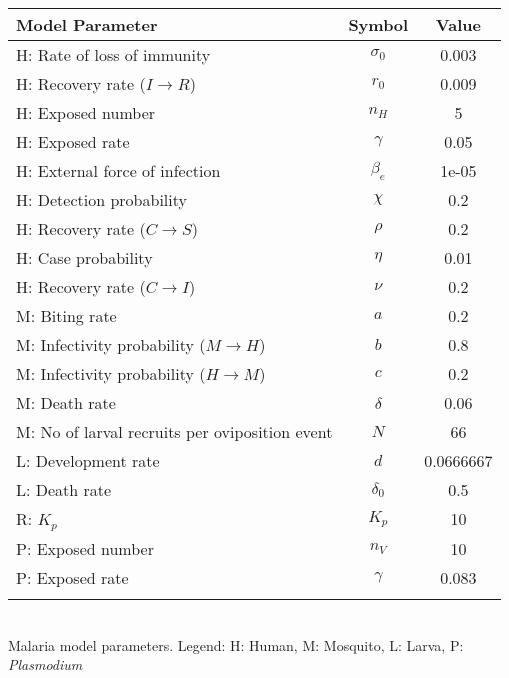 \begin{table}
\noindent
\begin{tabular}{lcc}
{\bf Model Parameter} & {\bf Symbol} & {\bf Value}\\
\hline\hline
  H: Rate of loss of immunity & $\sigma_0$ & 0.003\\
  H: Recovery rate ($I \rightarrow R$) & $r_0$ & 0.009\\
  H: Exposed number & $n_H$ & 5\\
  H: Exposed rate & $\gamma$ & 0.05\\
  H: External force of infection & $\beta_e$ & 1e-05\\
  H: Detection probability & $\chi$ & 0.2\\
  H: Recovery rate ($C \rightarrow S$) & $\rho$ & 0.2\\
  H: Case probability & $\eta$ & 0.01\\
  H: Recovery rate ($C \rightarrow I$) & $\nu$ & 0.2\\
  M: Biting rate & $a$ & 0.2\\
  M: Infectivity probability ($M \rightarrow H$) & $b$ & 0.8\\
  M: Infectivity probability ($H \rightarrow M$) & $c$ & 0.2\\
  M: Death rate & $\delta$ & 0.06\\
  M: No of larval recruits per oviposition event & $N$ & 66\\
  L: Development rate & $d$ & 0.0666667\\
  L: Death rate & $\delta_0$ & 0.5\\
  R: $K_p$ & $K_p$ & 10\\
  P: Exposed number & $n_V$ & 10\\
  P: Exposed rate & $\gamma$ & 0.083\\
\hline\hline
\smallskip
\end{tabular}\\
 Malaria model parameters. Legend: {\small H: Human, M: Mosquito, L: Larva, P: {\em Plasmodium}}
\end{table}
